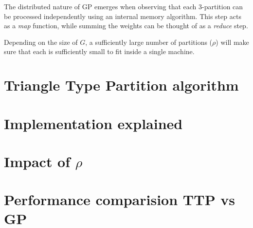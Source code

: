 \documentclass[paper=a4, fontsize=11pt]{scrartcl}
\numberwithin{equation}{section}
\numberwithin{figure}{section}
\numberwithin{table}{section}
\begin{document}
The distributed nature of GP emerges when observing that each 3-partition can be
processed independently using an internal memory algorithm. This step acts
as a \emph{map} function, while summing the weights can be thought of as a
\emph{reduce} step.

Depending on the size of $G$, a sufficiently large number of partitions ($\rho$)
will make sure that each is sufficiently small to fit inside a single machine.

\section{Triangle Type Partition algorithm}

\section{Implementation explained}

\section{Impact of $\rho$}

\section{Performance comparision TTP vs GP}
\end{document}
